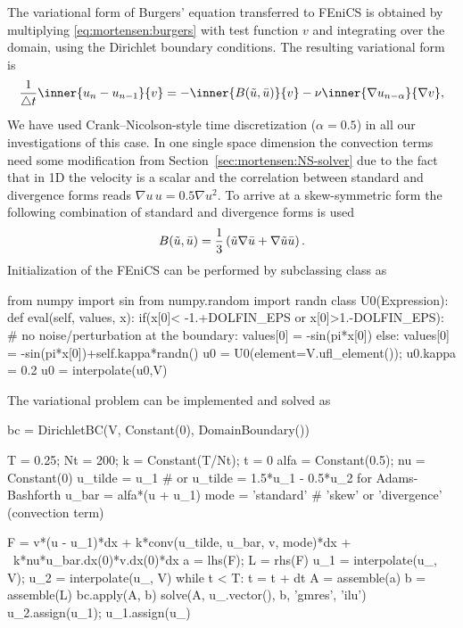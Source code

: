 The variational form of Burgers' equation transferred to FEniCS is
obtained by multiplying \eqref{eq:mortensen:burgers} with test
function $v$ and integrating over the domain, using the Dirichlet
boundary conditions. The resulting variational form is
\begin{equation}
 \frac{1}{\triangle t}\inner{ u_{n} - u_{n-1}}{v}
      = - \inner{B(\tilde{u},\Bar{u})}{ v }
          - \nu \inner{ \nabla u_{n-\alpha}}{\nabla v },
\label{eq:mortensen:burgers_vf}
\end{equation}
We have used Crank--Nicolson-style time discretization ($\alpha=0.5$)
in all our investigations of this case. In one single space
dimension the convection terms need some modification from
Section~\ref{sec:mortensen:NS-solver} due to the fact that in 1D the
velocity is a scalar and the correlation between standard and divergence
forms reads $\nabla u \, u =0.5 \nabla u^2$. To arrive at a skew-symmetric
form the following combination of standard and divergence forms is used
\begin{equation}
 B(\tilde{u},\Bar{u})
    = \frac{1}{3}\left( \tilde{u}\nabla \Bar{u}
      + \nabla \tilde{u} \Bar{u} \right).
\end{equation}
Initialization of the FEniCS  can be performed by
subclassing class  as
\begin{python}
from numpy import sin
from numpy.random import randn
class U0(Expression):
    def eval(self, values, x):
        if(x[0]< -1.+DOLFIN_EPS or x[0]>1.-DOLFIN_EPS):
            # no noise/perturbation at the boundary:
            values[0] = -sin(pi*x[0])
        else:
            values[0] = -sin(pi*x[0])+self.kappa*randn()
u0 = U0(element=V.ufl_element()); u0.kappa = 0.2
u0 = interpolate(u0,V)
\end{python}
The variational problem can be implemented and solved as
\begin{python}
bc = DirichletBC(V, Constant(0), DomainBoundary())

T = 0.25; Nt = 200; k = Constant(T/Nt); t = 0
alfa = Constant(0.5); nu = Constant(0)
u_tilde = u_1 # or u_tilde = 1.5*u_1 - 0.5*u_2 for Adams-Bashforth
u_bar = alfa*(u + u_1)
mode = 'standard'  # 'skew' or 'divergence' (convection term)

F = v*(u - u_1)*dx + k*conv(u_tilde, u_bar, v, mode)*dx + \
    k*nu*u_bar.dx(0)*v.dx(0)*dx
a = lhs(F); L = rhs(F)
u_1 = interpolate(u_, V); u_2 = interpolate(u_, V)
while t < T:
    t = t + dt
    A = assemble(a)
    b = assemble(L)
    bc.apply(A, b)
    solve(A, u_.vector(), b, 'gmres', 'ilu')
    u_2.assign(u_1); u_1.assign(u_)
\end{python}

